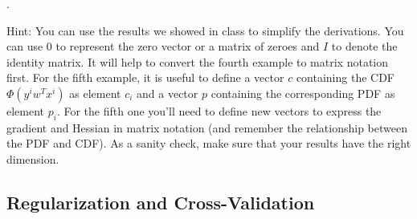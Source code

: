 \documentclass{article}
\begin{document}
.

Hint: You can use the results we showed in class to simplify the derivations. You can use $0$ to represent the zero vector or a matrix of zeroes and $I$ to denote the identity matrix. It will help to convert the fourth example to matrix notation first. For the fifth example, it is useful to define a vector $c$ containing the CDF $\Phi(y^iw^Tx^i)$ as element $c_i$ and a vector $p$ containing the corresponding PDF as element $p_i$. For the fifth one you'll need to define new vectors to express the gradient and Hessian in matrix notation (and remember the relationship between the PDF and CDF). As a sanity check, make sure that your results have the right dimension.



\subsection{Regularization and Cross-Validation}
\end{document}
